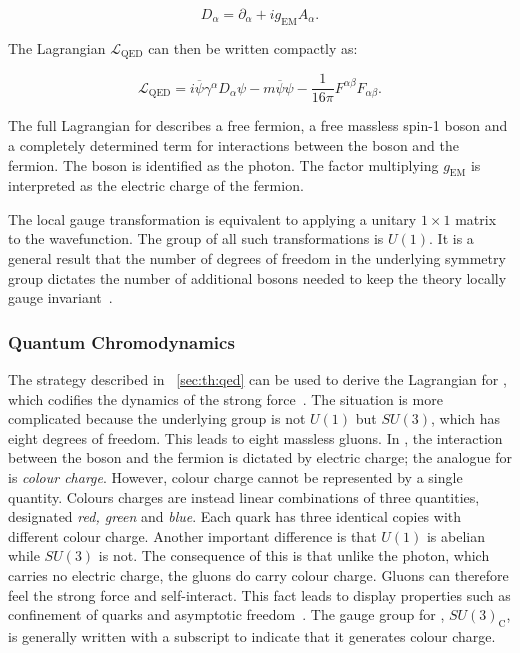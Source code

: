 \begin{equation}
\label{eq:th:covariant_derivative}
D_{\alpha} = \partial_{\alpha} + i g_{\textrm{EM}}A_{\alpha}.
\end{equation}

The Lagrangian $\mathcal{L}_{\textrm{QED}}$ can then be written compactly as:

\begin{equation}
\label{eq:th:QED_lagrangian}
\mathcal{L}_{\textrm{QED}} = i\overline{\psi} \gamma^{\alpha} D_{\alpha} \psi - m\overline{\psi}\psi -\frac{1}{16\pi} F^{\alpha\beta}F_{\alpha\beta}.
\end{equation}

The full Lagrangian for \QED describes a free fermion, a free massless spin-1 boson and a completely determined term for interactions between the boson and the fermion. The boson is identified as the photon. The factor multiplying $g_{\textrm{EM}}$ is interpreted as the electric charge of the fermion.

The local gauge transformation is equivalent to applying a unitary $1\times1$ matrix to the wavefunction. The group of all such transformations is $U(1)$. It is a general result that the number of degrees of freedom in the underlying symmetry group dictates the number of additional bosons needed to keep the theory locally gauge invariant~\cite{griffiths2008introduction}. 

\subsubsection{Quantum Chromodynamics}

The strategy described in \Sec~\ref{sec:th:qed} can be used to derive the Lagrangian for \QCD, which codifies the dynamics of the strong force~\cite{griffiths2008introduction}.  %
The situation is more complicated because the underlying group is not $U(1)$ but $SU(3)$, which has eight degrees of freedom. This leads to eight massless gluons. In \QED, the interaction between the boson and the fermion is dictated by electric charge; the analogue for \QCD is \emph{colour charge}. However, colour charge cannot be represented by a single quantity. Colours charges are instead linear combinations of three quantities, designated \emph{red, green} and \emph{blue}. Each \SM quark has three identical copies with different colour charge. Another important difference is that $U(1)$ is abelian while $SU(3)$ is not. The consequence of this is that unlike the \QED photon, which carries no electric charge, the \QCD gluons do carry colour charge. Gluons can therefore feel the strong force and self-interact. This fact leads \QCD to display properties such as confinement of quarks and asymptotic freedom~\cite{PhysRevLett.30.1346,PhysRevLett.30.1343}. The gauge group for \QCD, $SU(3)_{\textrm{C}}$, is generally written with a subscript to indicate that it generates colour charge. 

